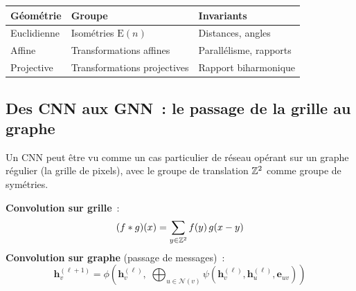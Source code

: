 \begin{exemple}
\begin{center}
\begin{tabular}{lll}
\toprule
\textbf{G\'eom\'etrie} & \textbf{Groupe} & \textbf{Invariants} \\
\midrule
Euclidienne & Isom\'etries $\mathrm{E}(n)$ & Distances, angles \\
Affine & Transformations affines & Parall\'elisme, rapports \\
Projective & Transformations projectives & Rapport biharmonique \\
\bottomrule
\end{tabular}
\end{center}
\end{exemple}

\subsection{Des CNN aux GNN~: le passage de la grille au graphe}

Un CNN peut \^etre vu comme un cas particulier de r\'eseau op\'erant sur un
graphe r\'egulier (la grille de pixels), avec le groupe de translation
$\mathbb{Z}^2$ comme groupe de sym\'etries.

\begin{formules}[title=\textbf{Convolution discr\`ete sur grille vs.\ graphe}]
\textbf{Convolution sur grille}~:
\[
    (f * g)(x) = \sum_{y \in \mathbb{Z}^2} f(y)\, g(x - y)
\]
\textbf{Convolution sur graphe} (passage de messages)~:
\[
    \mathbf{h}_v^{(\ell+1)} = \phi\!\left(\mathbf{h}_v^{(\ell)},\;
    \bigoplus_{u \in \mathcal{N}(v)} \psi\!\left(\mathbf{h}_v^{(\ell)},
    \mathbf{h}_u^{(\ell)}, \mathbf{e}_{uv}\right)\right)
\]
\end{formules}

